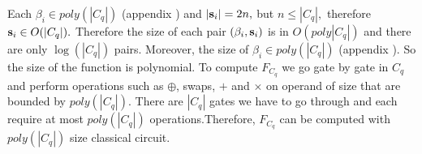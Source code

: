 Each $\beta_i \in poly(|C_q|)$ (appendix ) and $|{\bf s}_i|=2n,$ but $n\leq |C_q|,$ therefore ${\bf s}_i \in O(|C_q|).$  Therefore the size of each pair $(\beta_i, {\bf s}_i)$ is in $O(poly|C_q|)$ and there are only $\log(|C_q|)$ pairs.
 Moreover,  the size of $\beta_i \in poly(|C_q|)$ (appendix ). So the size of the function is polynomial. To compute $F_{C_q}$ we go gate by gate in $C_q$ and perform operations such as $\oplus$, swaps, $+$ and $\times$ on operand of size that are bounded by $poly(|C_q|).$ There are $|C_q|$ gates we have to go through and each require at most $poly(|C_q|)$ 
operations.Therefore, $F_{C_q}$ can be computed with $poly(|C_q|)$ size classical circuit. 












